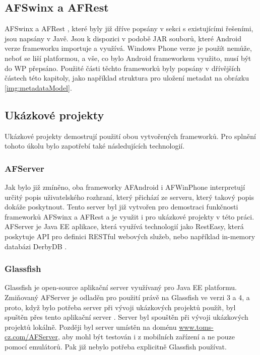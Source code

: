 \subsection{AFSwinx a AFRest}
AFSwinx a AFRest \cite{tomasek-thesis}, které byly již dříve popsány v sekci s existujícími řešeními, jsou napsány v Javě. Jsou k dispozici v podobě JAR souborů, které Android verze frameworku importuje a využívá. Windows Phone verze je použít nemůže, neboť se liší platformou, a vše, co bylo Android frameworkem využito, musí být do WP přepsáno.
Použité části těchto frameworků byly popsány v dřívějších částech této kapitoly, jako například struktura pro uložení metadat na obrázku \ref{img:metadataModel}.

\subsection{Ukázkové projekty}  
Ukázkové projekty demostrují použití obou vytvořených frameworků. Pro splnění tohoto úkolu bylo zapotřebí také následujících technologií.
\subsubsection{AFServer}
Jak bylo již zmíněno, oba frameworky AFAndroid i AFWinPhone interpretují určitý popis uživatelského rozhraní, který přichází ze serveru, který takový popis dokáže poskytnout. Tento server byl již vytvořen pro demostraci funkčnosti frameworků AFSwinx a AFRest a je využit i pro ukázkové projekty v této práci. AFServer je Java EE aplikace, která využívá technologií jako RestEasy, která poskytuje API pro definici RESTful webových služeb, nebo například in-memory databázi DerbyDB \cite{tomasek-thesis}. 
\subsubsection{Glassfish}
Glassfish \cite{glassfish} je open-source aplikační server využívaný pro Java EE platformu. Zmiňovaný AFServer je odladěn pro použití právě na Glassfish ve verzi 3 a 4, a proto, když bylo potřeba server při vývoji ukázkových projektů použít, byl spuštěn přes tento aplikační server \cite{tomasek-thesis}. Server byl spouštěn při vývoji ukázkových projektů lokálně. Později byl server umístěn na doménu \url{www.toms-cz.com/AFServer}, aby mohl být testován i z mobilních zařízení a ne pouze pomocí emulátorů. Pak již nebylo potřeba explicitně Glassfish používat.
